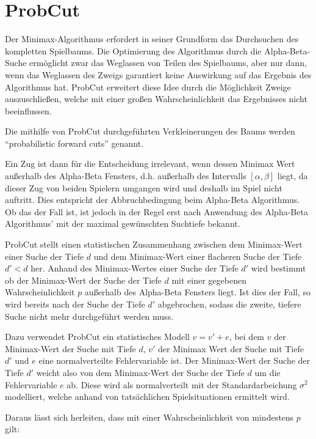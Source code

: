 \section{ProbCut}

Der Minimax-Algorithmus erfordert in seiner Grundform das Durchsuchen des kompletten Spielbaums.
Die Optimierung des Algorithmus durch die Alpha-Beta-Suche ermöglicht zwar das Weglassen von Teilen des Spielbaums, aber nur dann, wenn das Weglassen des Zweigs garantiert keine Auswirkung auf das Ergebnis des Algorithmus hat.
ProbCut erweitert diese Idee durch die Möglichkeit Zweige auszuschließen, welche mit einer großen Wahrscheinlichkeit das Ergebnisses nicht beeinflussen.

Die mithilfe von ProbCut durchgeführten Verkleinerungen des Baums werden "`probabilistic forward cuts"' genannt.

Ein Zug ist dann für die Entscheidung irrelevant, wenn dessen Minimax Wert außerhalb des Alpha-Beta Fensters, d.h. außerhalb des Intervalls \([\alpha,\beta]\) liegt, da dieser Zug von beiden Spielern umgangen wird und deshalb im Spiel nicht auftritt.
Dies entspricht der Abbruchbedingung beim Alpha-Beta Algorithmus.
Ob das der Fall ist, ist jedoch in der Regel erst nach Anwendung des Alpha-Beta Algorithmus' mit der maximal gewünschten Suchtiefe bekannt.

ProbCut stellt einen statistischen Zusammenhang zwischen dem Minimax-Wert einer Suche der Tiefe \(d\) und dem Minimax-Wert einer flacheren Suche der Tiefe \(d'<d\) her.
Anhand des Minimax-Wertes einer Suche der Tiefe \(d'\) wird bestimmt ob der Minimax-Wert der Suche der Tiefe \(d\) mit einer gegebenen Wahrscheinlichkeit \(p\) außerhalb des Alpha-Beta Fensters liegt.
Ist dies der Fall, so wird bereits nach der Suche der Tiefe \(d'\) abgebrochen, sodass die zweite, tiefere Suche nicht mehr durchgeführt werden muss.

Dazu verwendet ProbCut ein statistisches Modell \(v=v'+e\), bei dem \(v\) der Minimax-Wert der Suche mit Tiefe \(d\), \(v'\) der Minimax Wert der Suche mit Tiefe \(d'\) und \(e\) eine normalverteilte Fehlervariable ist.
Der Minimax-Wert der Suche der Tiefe \(d'\) weicht also von dem Minimax-Wert der Suche der Tiefe \(d\) um die Fehlervariable \(e\) ab. Diese wird als normalverteilt mit der Standardarbeichung \(\sigma^2\) modelliert,
welche anhand von tatsächlichen Spielsituationen ermittelt wird.

Daraus lässt sich herleiten, dass mit einer Wahrscheinlichkeit von mindestens \(p\) gilt:

